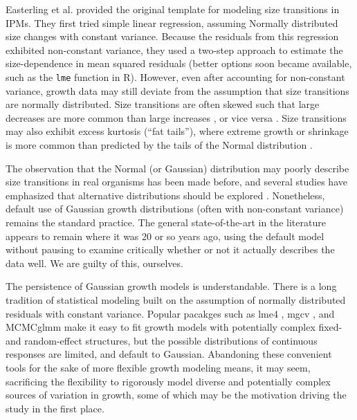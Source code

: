 \documentclass[12pt]{article}
\begin{document}
Easterling et al. \citeyear{easterling2000size} provided the original template for modeling size transitions in IPMs. 
They first tried simple linear regression, assuming Normally distributed size changes with constant variance. 
Because the residuals from this regression exhibited non-constant variance, they used a two-step approach to estimate the size-dependence in mean squared residuals (better options soon became available, such as the \texttt{lme} function in R). 
However, even after accounting for non-constant variance, growth data may still deviate from the assumption that size transitions are normally distributed.  
Size transitions are often skewed such that large decreases are more common than large increases \citep{peterson2019improving,salguero2010keeping}, or vice versa \citep{stubberud2019effects}.
Size transitions may also exhibit excess kurtosis (``fat tails''), where extreme growth or shrinkage is more common than predicted by the tails of the Normal distribution \citep{herault2011functional}. 

The observation that the Normal (or Gaussian) distribution may poorly describe size transitions in real organisms has been made before,  
and several studies have emphasized that alternative distributions should be explored \citep{easterling2000size,peterson2019improving,rees2014building,williams2012avoiding}. 
Nonetheless, default use of Gaussian growth distributions (often with non-constant variance) remains the standard practice. 
The general state-of-the-art in the literature appears to remain where it was 20 or so years ago, using the default model without pausing to examine critically whether or not it actually describes the data well.  
We are guilty of this, ourselves. 

The persistence of Gaussian growth models is understandable. 
There is a long tradition of statistical modeling built on the assumption of normally distributed residuals with constant variance.
Popular pacakges such as lme4 \citep{bates2007lme4}, mgcv \citep{wood-2017}, and MCMCglmm \citep{hadfield2010mcmc} make it easy to fit growth models with potentially complex fixed- and random-effect structures, but the possible distributions of continuous responses are limited, and default to Gaussian.
Abandoning these convenient tools for the sake of more flexible growth modeling means, it may seem, sacrificing the flexibility to rigorously model diverse and potentially complex sources of variation in growth, some of which may be the motivation driving the study in the first place.
\end{document}
